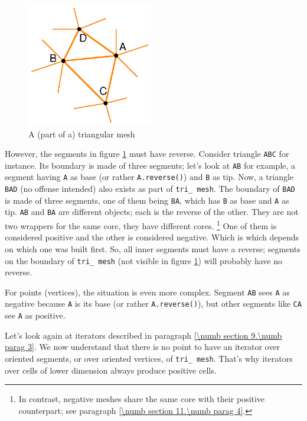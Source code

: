 \begin{figure}[ht] \centering
  \includegraphics[width=55mm]{malha-tri}
  \caption{A (part of a) triangular mesh}
  \label{\numb section 9.\numb fig 2}
\end{figure}

However, the segments in figure \ref{\numb section 9.\numb fig 2} must have reverse.
Consider triangle {\small\tt ABC} for instance.
Its boundary is made of three segments; let's look at {\small\tt AB} for example,
a segment having {\small\tt A} as base (or rather {\small\tt A.reverse()}) and
{\small\tt B} as tip.
Now, a triangle {\small\tt BAD} (no offense intended) also exists as part of
{\small\tt tri\_\,mesh}.
The boundary of {\small\tt BAD} is made of three segments, one of them being {\small\tt BA},
which has {\small\tt B} as base and {\small\tt A} as tip.
{\small\tt AB} and {\small\tt BA} are different {\small\tt {}} objects;
each is the reverse of the other.
They are not two wrappers for the same core, they have different cores.%
\footnote {{} In contrast, negative meshes share the same core with their positive
counterpart; see paragraph \ref{\numb section 11.\numb parag 4}.}
One of them is considered positive and the other is considered negative.
Which is which depends on which one was built first.
So, all inner segments must have a reverse;
segments on the boundary of {\small\tt tri\_\,mesh} (not visible in figure
\ref{\numb section 9.\numb fig 2}) will probably have no reverse.

For points (vertices), the situation is even more complex.
Segment {\small\tt AB} sees {\small\tt A} as negative because {\small\tt A} is its base
(or rather {\small\tt A.reverse()}),
but other segments like {\small\tt CA} see {\small\tt A} as positive.

Let's look again at iterators described in paragraph \ref{\numb section 9.\numb parag 3}.
We now understand that there is no point to have an iterator over oriented
segments, or over oriented vertices, of {\small\tt tri\_\,mesh}.
That's why iterators over cells of lower dimension always produce positive cells.

